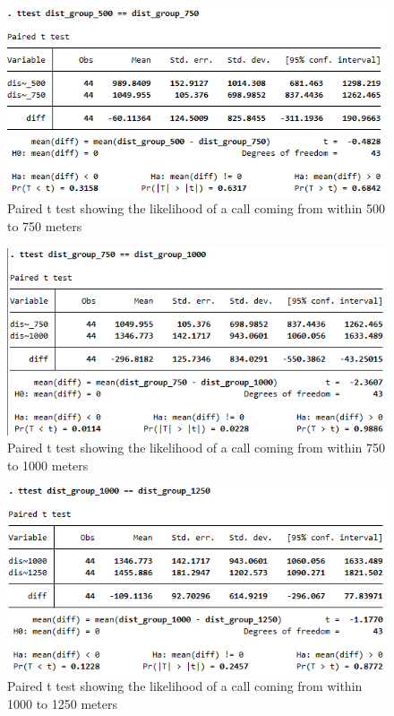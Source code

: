 \documentclass[12pt]{article}
\begin{document}
\begin{figure}
    \centering
    \includegraphics[width=1\linewidth]{image500-750.png}
    \caption{Paired t test showing the likelihood of a call coming from within 500 to 750 meters}
\end{figure}
\begin{figure}
    \centering
    \includegraphics[width=1\linewidth]{image750-1000.png}
    \caption{Paired t test showing the likelihood of a call coming from within 750 to 1000 meters}
\end{figure}
\begin{figure}
    \centering
    \includegraphics[width=1\linewidth]{image1000-1250.png}
    \caption{Paired t test showing the likelihood of a call coming from within 1000 to 1250 meters}
\end{figure}
\end{document}
